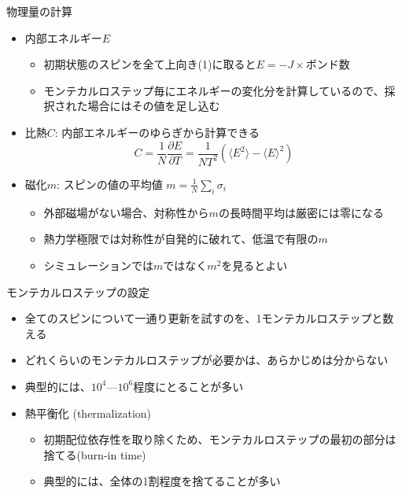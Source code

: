 \begin{frame}[t,fragile]{物理量の計算}
  \begin{itemize}
  \item 内部エネルギー$E$
    \begin{itemize}
    \item 初期状態のスピンを全て上向き(1)に取ると$E=-J \times \text{ボンド数}$
    \item モンテカルロステップ毎にエネルギーの変化分を計算しているので、採択された場合にはその値を足し込む
    \end{itemize}
  \item 比熱$C$: 内部エネルギーのゆらぎから計算できる
    \[
    C = \frac{1}{N} \frac{\partial E}{\partial T} = \frac{1}{NT^2} (\langle E^2 \rangle - \langle E \rangle^2)
    \]
  \item 磁化$m$: スピンの値の平均値 $m = \frac{1}{N} \sum_i \sigma_i$
    \begin{itemize}
    \item 外部磁場がない場合、対称性から$m$の長時間平均は厳密には零になる
    \item 熱力学極限では対称性が自発的に破れて、低温で有限の$m$
    \item シミュレーションでは$m$ではなく$m^2$を見るとよい
    \end{itemize}
  \end{itemize}
\end{frame}

\begin{frame}[t,fragile]{モンテカルロステップの設定}
  \begin{itemize}
  \item 全てのスピンについて一通り更新を試すのを、1モンテカルロステップと数える
  \item どれくらいのモンテカルロステップが必要かは、あらかじめは分からない
  \item 典型的には、$10^4$---$10^6$程度にとることが多い
  \item 熱平衡化 (thermalization)
    \begin{itemize}
    \item 初期配位依存性を取り除くため、モンテカルロステップの最初の部分は捨てる(burn-in time)
    \item 典型的には、全体の1割程度を捨てることが多い
    \end{itemize}
  \end{itemize}
\end{frame}
